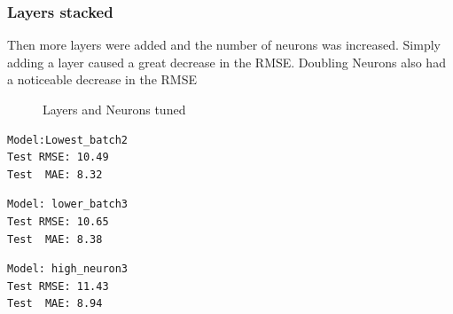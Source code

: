 \documentclass[10pt,11pt,12pt,oneside]{book}
\begin{document}
\subsubsection{Layers stacked}
Then more layers were added and the number of neurons was increased. Simply adding a layer caused a great decrease in the RMSE. Doubling Neurons also had a noticeable decrease in the RMSE\\
\begin{figure}[H]
    \centering
    \qquad
    \caption{Layers and Neurons tuned}%
    \label{fig:layers}%
\end{figure}
\begin{multicols}{3}
\centering
\begin{verbatim}
Model:Lowest_batch2
Test RMSE: 10.49
Test  MAE: 8.32
\end{verbatim}
\begin{verbatim}
Model: lower_batch3
Test RMSE: 10.65
Test  MAE: 8.38
\end{verbatim}
\begin{verbatim}
Model: high_neuron3
Test RMSE: 11.43
Test  MAE: 8.94
\end{verbatim}
\end{multicols}
\end{document}
